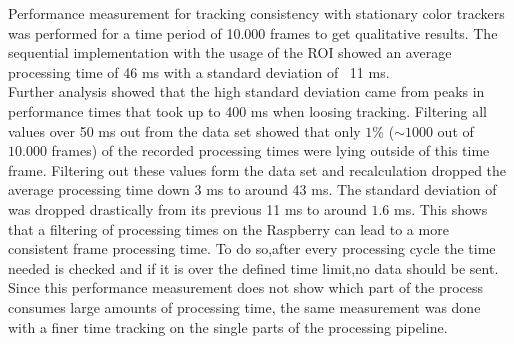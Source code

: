 Performance measurement for tracking consistency with stationary color trackers was performed for a time period of 10.000 frames to get qualitative results. The sequential implementation with the usage of the ROI showed an average processing time of 46 ms with a standard deviation of ~11 ms.\\
Further analysis showed that the high standard deviation came from peaks in performance times that took up to 400 ms when loosing tracking. Filtering all values over 50 ms out from the data set showed that only $1\%$ ($\sim 1000$ out of $10.000$ frames) of the recorded processing times were lying outside of this time frame. Filtering out these values form the data set and recalculation dropped the average processing time down 3 ms to around 43 ms. The standard deviation of was dropped drastically from its previous 11 ms to around $1.6$ ms. This shows that a filtering of processing times on the Raspberry can lead to a more consistent frame processing time. To do so,after every processing cycle the time needed is checked and if it is over the defined time limit,no data should be sent.\\
Since this performance measurement does not show which part of the process consumes large amounts of processing time, the same measurement was done with a finer time tracking on the single parts of the processing pipeline.
